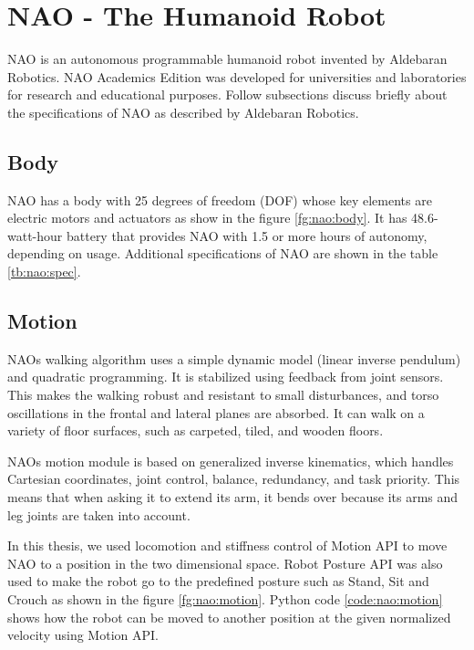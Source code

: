 \section{NAO - The Humanoid Robot} NAO is an autonomous programmable humanoid robot invented by Aldebaran Robotics. NAO Academics Edition was developed for universities and laboratories for research and educational purposes. Follow subsections discuss briefly about the specifications of NAO as described by Aldebaran Robotics.



\subsection{Body} NAO has a body with 25 degrees of freedom (DOF) whose key elements are electric motors and actuators as show in the figure \ref{fg:nao:body}. It has 48.6-watt-hour battery that provides NAO with 1.5 or more hours of autonomy, depending on usage. Additional specifications of NAO are shown in the table \ref{tb:nao:spec}. 



\subsection{Motion} NAOs walking algorithm uses a simple dynamic model (linear inverse pendulum) and quadratic programming. It is stabilized using feedback from joint sensors. This makes the walking robust and resistant to small disturbances, and torso oscillations in the frontal and lateral planes are absorbed. It can walk on a variety of floor surfaces, such as carpeted, tiled, and wooden floors. 

NAOs motion module is based on generalized inverse kinematics, which handles Cartesian coordinates, joint control, balance, redundancy, and task priority. This means that when asking it to extend its arm, it bends over because its arms and leg joints are taken into account.



In this thesis, we used locomotion and stiffness control of Motion API to move NAO to a position in the two dimensional space. Robot Posture API was also used to make the robot go to the predefined posture such as Stand, Sit and Crouch as shown in the figure \ref{fg:nao:motion}. Python code \ref{code:nao:motion} shows how the robot can be moved to another position at the given normalized velocity using Motion API. 

